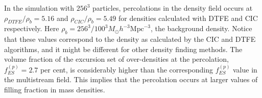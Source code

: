 In the simulation with $256^3$ particles, percolations in the density field occurs at $\rho_{DTFE}/ \rho_b = 5.16 $ and $\rho_{CIC}/ \rho_b = 5.49 $ for densities calculated with DTFE and CIC respectively. Here $\rho_b = 256^3 / 100^3 M_{\odot} h^{-3} \text{Mpc}^{-3}$, the background density. Notice that these values correspond to the density as calculated by the CIC and DTFE algorithms, and it might be different for other density finding methods. The volume fraction of the excursion set of over-densities at the percolation, $f_{ES}^{(p)} = 2.7$ per cent, is considerably higher than the corresponding $f_{ES}^{(p)}$ value in the multistream field. This implies that the percolation occurs at larger values of filling fraction in mass densities. 




